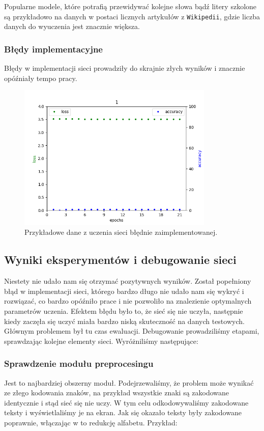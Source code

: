 Popularne modele, które potrafią przewidywać kolejne słowa bądź litery szkolone są przykładowo na danych w postaci licznych 
artykułów z \texttt{Wikipedii}, gdzie liczba danych do wyuczenia jest znacznie większa.

\newpage
\subsubsection{Błędy implementacyjne}
Błędy w implementacji sieci prowadziły do skrajnie złych wyników i znacznie opóźniały tempo pracy.
\begin{figure}[H]
	\centering
	\includegraphics[height=7cm]{./images/result1.png}
	\caption{Przykładowe dane z uczenia sieci błędnie zaimplementowanej.}
	\label{fig:test5}
	\end{figure}

\subsection{Wyniki eksperymentów i debugowanie sieci}
Niestety nie udało nam się otrzymać pozytywnych wyników. Został popełniony błąd w implementacji sieci,
którego bardzo długo nie udało nam się wykryć i rozwiązać, co bardzo opóźniło prace i nie pozwoliło na znalezienie
optymalnych parametrów uczenia. Efektem błędu było to, że sieć się nie uczyła, następnie kiedy zaczęła się 
uczyć miała bardzo niską skuteczność na danych testowych. Głównym problemem był tu czas ewaluacji. 
Debugowanie prowadziliśmy etapami, sprawdzając kolejne elementy sieci. Wyróżniliśmy następujące:

\subsubsection{Sprawdzenie modułu preprocesingu}
	Jest to najbardziej obszerny moduł. Podejrzewaliśmy, że problem może wynikać ze złego kodowania znaków,
	na przykład wszystkie znaki są zakodowane identycznie i stąd sieć się nie uczy. W tym celu odkodowywaliśmy
	zakodowane teksty i wyświetlaliśmy je na ekran. Jak się okazało teksty były zakodowane poprawnie, włączając w
	to redukcję alfabetu. Przykład:
	
